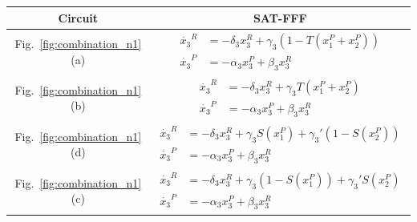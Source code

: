 {
\setlength{\tabcolsep}{10pt}
\renewcommand{\arraystretch}{3.0}
\begin{table}[H]
    \centering
    \vspace{0.2cm}
    \begin{tabular}{|c|c|}
        \hline
        \textbf{Circuit} & \textbf{SAT-FFF} \\
        \hline
        Fig.~\ref{fig:combination_n1}(a) & $\begin{aligned}
            \dot{x_3}^R &= -\delta_3 x_3^R + \gamma_3(1-T(x_1^P+x_2^P))\\
            \dot{x_3}^P &= -\alpha_3 x_3^P + \beta_3 x_3^R
        \end{aligned}$ \\[0.25cm]
        \hline
        Fig.~\ref{fig:combination_n1}(b) & $\begin{aligned}
            \dot{x_3}^R &= -\delta_3 x_3^R + \gamma_3 T(x_1^P+x_2^P)\\
            \dot{x_3}^P &= -\alpha_3 x_3^P + \beta_3 x_3^R
        \end{aligned}$ \\[0.25cm]
        \hline
        Fig.~\ref{fig:combination_n1}(d) & $\begin{aligned}
            \dot{x_3}^R &= -\delta_3 x_3^R + \gamma_3 S(x_1^P) + \gamma_3'(1 - S(x_2^P))\\
            \dot{x_3}^P &= -\alpha_3 x_3^P + \beta_3 x_3^R
        \end{aligned}$
         \\[0.25cm]
        \hline
        Fig.~\ref{fig:combination_n1}(c) & $\begin{aligned}
            \dot{x_3}^R &= -\delta_3 x_3^R + \gamma_3(1 - S(x_1^P)) + \gamma_3' S(x_2^P) \\
            \dot{x_3}^P &= -\alpha_3 x_3^P + \beta_3 x_3^R
        \end{aligned}$
         \\[0.25cm]
        \hline
    \end{tabular}
\end{table}
}

